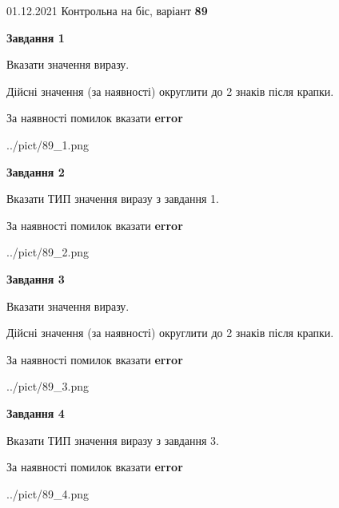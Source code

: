\documentclass[11pt, ukrainian]{article}
\begin{document}
{01.12.2021 Контрольна на біс, варіант  \No \textbf { 89 }\par}
{
\begin {large}
{\begin {center}\textbf{Завдання 1}\end {center}}\par
Вказати значення виразу. \par
Дійсні значення (за наявності) округлити до 2 знаків після крапки. \par
За наявності помилок вказати \textbf{error}

\begin{center}
	{../pict/89_1.png}
\end{center}
\newpage

{\begin {center}\textbf{Завдання 2}\end {center}}\par
Вказати ТИП значення виразу з завдання 1. \par
За наявності помилок вказати \textbf{error}

\begin{center}
	{../pict/89_2.png}
\end{center}
\newpage

{\begin {center}\textbf{Завдання 3}\end {center}}\par
Вказати значення виразу. \par
Дійсні значення (за наявності) округлити до 2 знаків після крапки. \par
За наявності помилок вказати \textbf{error}

\begin{center}
	{../pict/89_3.png}
\end{center}
\newpage

{\begin {center}\textbf{Завдання 4}\end {center}}\par
Вказати ТИП значення виразу з завдання 3. \par
За наявності помилок вказати \textbf{error}

\begin{center}
	{../pict/89_4.png}
\end{center}
\newpage


\end{large}}
\end{document}
